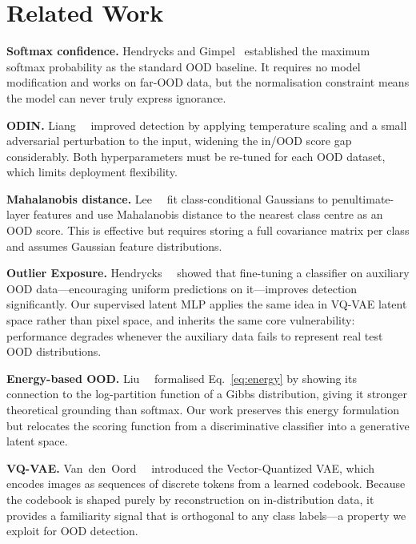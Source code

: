 \documentclass[10pt,twocolumn,letterpaper]{article}
\begin{document}
\section{Related Work}

\textbf{Softmax confidence.}
Hendrycks and Gimpel~\cite{hendrycks2017} established the
maximum softmax probability as the standard OOD baseline.
It requires no model modification and works on far-OOD
data, but the normalisation constraint means the model
can never truly express ignorance.

\textbf{ODIN.}
Liang~\etal~\cite{liang2018} improved detection by applying
temperature scaling and a small adversarial perturbation to
the input, widening the in/OOD score gap considerably.
Both hyperparameters must be re-tuned for each OOD dataset,
which limits deployment flexibility.

\textbf{Mahalanobis distance.}
Lee~\etal~\cite{lee2018} fit class-conditional Gaussians to
penultimate-layer features and use Mahalanobis distance to
the nearest class centre as an OOD score.
This is effective but requires storing a full covariance
matrix per class and assumes Gaussian feature distributions.

\textbf{Outlier Exposure.}
Hendrycks~\etal~\cite{hendrycks2019} showed that fine-tuning
a classifier on auxiliary OOD data---encouraging uniform
predictions on it---improves detection significantly.
Our supervised latent MLP applies the same idea in VQ-VAE
latent space rather than pixel space, and inherits the same
core vulnerability: performance degrades whenever the
auxiliary data fails to represent real test OOD distributions.

\textbf{Energy-based OOD.}
Liu~\etal~\cite{liu2020} formalised Eq.~\eqref{eq:energy}
by showing its connection to the log-partition function of a
Gibbs distribution, giving it stronger theoretical grounding
than softmax.
Our work preserves this energy formulation but relocates the
scoring function from a discriminative classifier into a
generative latent space.

\textbf{VQ-VAE.}
Van~den~Oord~\etal~\cite{vqvae2017} introduced the
Vector-Quantized VAE, which encodes images as sequences of
discrete tokens from a learned codebook.
Because the codebook is shaped purely by reconstruction
on in-distribution data, it provides a familiarity signal
that is orthogonal to any class labels---a property we
exploit for OOD detection.

\end{document}
